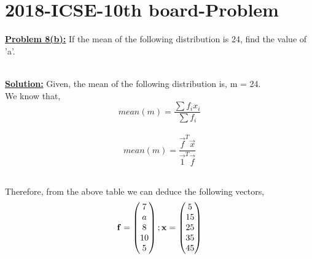 \documentclass[journal,12pt,twocolumn]{IEEEtran}
\begin{document}
	\section{2018-ICSE-10th board-Problem}
	\textbf{\underline{Problem 8(b):} }If the mean of the following distribution is 24, find the value of 'a'.
	\begin{table}[htb]
		\centering
	\end{table}\\
	\textbf{\underline{Solution:} }Given, the mean of the following distribution is, m = 24.\\
	We know that,
	\begin{equation} \label{eqn}
		mean(m) = \frac{\sum f_ix_i}{\sum f_i}
	\end{equation}
\\
\begin{equation} \label{eqn}
	mean(m) = \frac{\vec{f}^T\vec{x}}{\vec{1}^T\vec{f}}
\end{equation}
	\begin{table}[h!]
	\centering
\end{table}
\\
Therefore, from the above table we can deduce the following vectors,\\
	\begin{equation*}
		\mathbf{f} = \begin{pmatrix}7\\a\\8\\10\\5\end{pmatrix}
		; 
	\mathbf{x} = \begin{pmatrix}5\\15\\25\\35\\45\end{pmatrix}
	\end{equation*}
\end{document}
